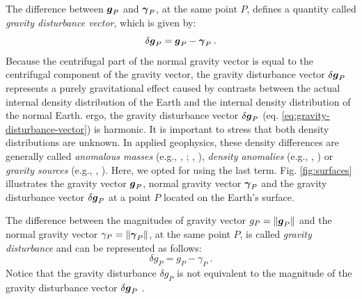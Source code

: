 \documentclass[extra]{gji}
\begin{document}
The difference between $\mitbf{g}_{P}$ and $\mitbf{\gamma}_{P}$, at the same 
point $P$, defines a quantity called \textit{gravity disturbance 
vector}, which is given by:
\begin{equation}
\delta \mitbf{g}_{P} = 
\mitbf{g}_{P} - \mitbf{\gamma}_{P} \: .
\label{eq:gravity-disturbance-vector}
\end{equation}
Because the centrifugal part of the normal gravity vector 
is equal to the centrifugal component of the gravity vector, 
the gravity disturbance vector $\delta \mitbf{g}_{P}$ represents 
a purely gravitational effect caused by contrasts between the actual internal 
density distribution of the Earth and the internal density 
distribution of the normal Earth.
ergo, the gravity disturbance vector $\delta \mitbf{g}_{P}$ 
(eq. \ref{eq:gravity-disturbance-vector}) is harmonic.
It is important to stress that both density distributions are unknown.
In applied geophysics, these density differences are generally 
called \textit{anomalous masses} (e.g., \citeauthor{hammer1945}, 
\citeyear{hammer1945}; \citeauthor{lafehr1965}, \citeyear{lafehr1965}),
\textit{density anomalies} (e.g., \citeauthor{forsberg1984}, 
\citeyear{forsberg1984}) or \textit{gravity sources} (e.g., 
\citeauthor{blakely1996}, \citeyear{blakely1996}). Here, we opted for 
using the last term.
Fig. \ref{fig:surfaces} illustrates the gravity vector 
$\mitbf{g}_{P}$, normal gravity vector $\mitbf{\gamma}_{P}$ and 
the gravity disturbance vector $\delta \mitbf{g}_{P}$ at a point $P$ 
located on the Earth's surface.

The difference between the magnitudes of gravity vector
$g_{P} = \| \mitbf{g}_{P} \|$ and the normal gravity vector
$\gamma_{P} = \| \mitbf{\gamma}_{P} \|$, at the 
same point $P$, is called \textit{gravity disturbance} 
\citep{heiskanen-moritz1967, hofmann-wellenhof-moritz2005} 
and can be represented as follows:
\begin{equation}
\delta g_{P} = g_{P} - \gamma_{P} \: .
\label{eq:gravity-disturbance}
\end{equation}
Notice that the gravity disturbance $\delta g_{P}$ is not equivalent 
to the magnitude of the gravity disturbance vector 
$\delta \mitbf{g}_{P}$ \citep{barthelmes2013, sanso_sideris2013}.
\end{document}

